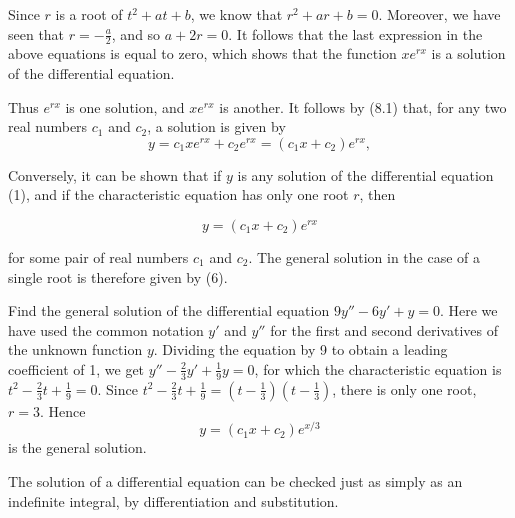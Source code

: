 \noindent Since $r$ is a root of $t^2 + at + b$, we know that $r^2 + ar + b = 0$. Moreover, we have seen that $r = -\frac{a}{2}$, and so $a + 2r = 0$. It follows that the last expression in the above equations is equal to zero, which shows that the function $xe^{rx}$ is a solution of the differential equation.

Thus $e^{rx}$ is one solution, and $xe^{rx}$ is another. It follows by (8.1) that, for any two real
numbers $c_1$ and $c_2$, a solution is given by
$$
y = c_{1}xe^{rx} + c_{2}e^{rx} = (c_{1}x + c_{2})e^{rx},
$$

\noindent Conversely, it can be shown that if $y$ is any solution of the differential equation (1), 
and if the characteristic equation has only one root $r$, then


\begin{equation}
y = (c_{1}x + c_2)e^{rx}
\label{eq6.8.6}
\end{equation}

\noindent for some pair of real numbers $c_1$ and $c_2$. The general solution in the case of a single root is therefore given by (6).

\begin{example} Find the general solution of the differential equation $9y'' - 6y' + y = 0$. Here we
 have used the common notation $y'$ and $y''$ for the first and second derivatives of the unknown function $y$. Dividing the equation by 9 to obtain a leading coefficient of 1, we get $y'' - \frac{2}{3}y' + \frac{1}{9}y = 0$, for which the characteristic equation is $t^2 - \frac{2}{3}t + \frac{1}{9} = 0$. Since $t^2 - \frac{2}{3}t + \frac{1}{9} = (t - \frac{1}{3})(t - \frac{1}{3})$, there is only one root, $r = 3$. Hence
$$
y = (c_{1}x + c_{2})e^{x/3}
$$
\noindent is the general solution.
\end{example}

The solution of a differential equation can be checked just as simply as an indefinite integral, by
differentiation and substitution.

